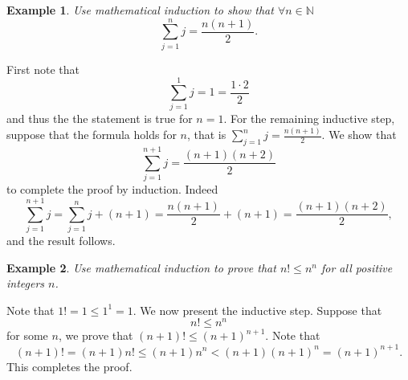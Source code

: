 \documentclass[12pt,letterpaper]{book}
\newtheorem{example}{Example}
\begin{document}
\begin{example}
Use mathematical induction to show that $\forall n\in \mathbb{N}$
\begin{equation}
\sum_{j=1}^nj=\frac{n(n+1)}{2}.
\end{equation}
\end{example}
\par First note that
\begin{equation*}
\sum_{j=1}^1j=1=\frac{1\cdot 2}{2}
\end{equation*}
and thus the the statement is true for $n=1$. For the remaining inductive step, suppose that the formula holds for
$n$, that is $\sum_{j=1}^nj=\frac{n(n+1)}{2}$.  We show
that
\begin{equation*}
\sum_{j=1}^{n+1}j=\frac{(n+1)(n+2)}{2}
\end{equation*}
to complete the proof by induction. Indeed
\begin{equation*}
\sum_{j=1}^{n+1}j=\sum_{j=1}^nj+(n+1)=\frac{n(n+1)}{2}+(n+1)=\frac{(n+1)(n+2)}{2},
\end{equation*}
and the result follows. 
\begin{example}
Use mathematical induction to prove that $n!\leq n^n$ for all
positive integers $n$.\\
\end{example}
\par Note that $1!=1\leq 1^1=1$.  We now present the inductive
step.  Suppose that
\begin{equation*}
n!\leq n^n
\end{equation*}
for some $n$, we prove that $(n+1)!\leq (n+1)^{n+1}$. Note that
\begin{equation*}
(n+1)!=(n+1)n!\leq (n+1)n^n<(n+1)(n+1)^{n}=(n+1)^{n+1}.
\end{equation*}
This completes the proof.
\end{document}
